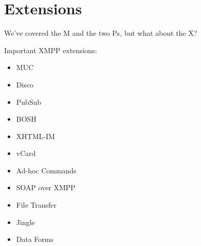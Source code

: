 \section{Extensions}

\pause

We've covered the M and the two Ps, but what about the X?

\pause
Important XMPP extensions:

\begin{itemize}
\item MUC
\item Disco
\item PubSub
\item BOSH
\item XHTML-IM
\item vCard
\item Ad-hoc Commands
\item SOAP over XMPP
\item File Transfer
\item Jingle
\item Data Forms
\end{itemize}
